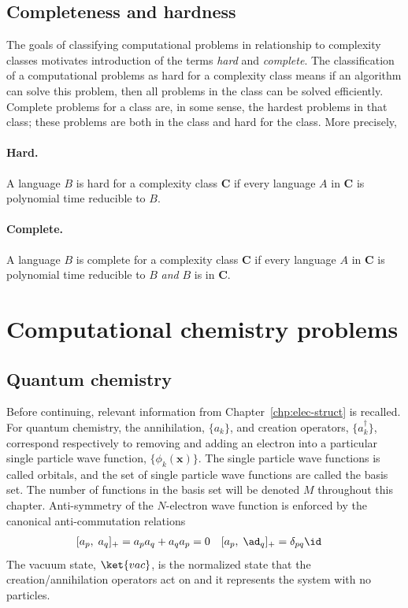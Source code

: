\documentclass[11pt,oneside,final]{huthesis}%
\begin{document}
\subsection{Completeness and hardness}
The goals of classifying computational problems in relationship to complexity classes motivates introduction of the terms \emph{hard} and \emph{complete}. The classification of a computational problems as hard for a complexity class means if an algorithm can solve this problem, then all problems in the class can be solved efficiently.  Complete problems for a class are, in some sense, the hardest problems in that class; these problems are both in the class and hard for the class.  More precisely,

\paragraph{Hard.} A language $B$ is hard for a complexity class \textbf{C} if every language $A$ in \textbf{C} is polynomial time reducible to $B$.

\paragraph{Complete.} A language $B$ is complete for a complexity class \textbf{C} if every language $A$ in \textbf{C} is polynomial time reducible to $B$ \emph{and} $B$ is in \textbf{C}.

\section{Computational chemistry problems}
\subsection{Quantum chemistry}
Before continuing, relevant information from Chapter~\ref{chp:elec-struct} is recalled.  For quantum chemistry, the annihilation, $\{a_k\}$, and creation operators, $\{a_k^{\dagger}\}$, correspond respectively to removing and adding an electron into a particular single particle wave function, $\{\phi_k(\mathbf{x})\}$. The single particle wave functions is called {orbitals}, and the set of single particle wave functions are called the {basis set}.  The number of functions in the basis set will be denoted $M$ throughout this chapter.  Anti-symmetry of the $N$-electron wave function is enforced by the canonical anti-commutation relations 
\begin{align*}
&[a_p, \;a_q]_+= a_pa_q+a_qa_p=0& &[a_p, \;\ad_q]_+=\delta_{pq}\id
\label{:CCR}
\end{align*}
The vacuum state, $\ket{vac}$, is the normalized state that the creation/annihilation operators act on and it represents the system with no particles.
\end{document}
